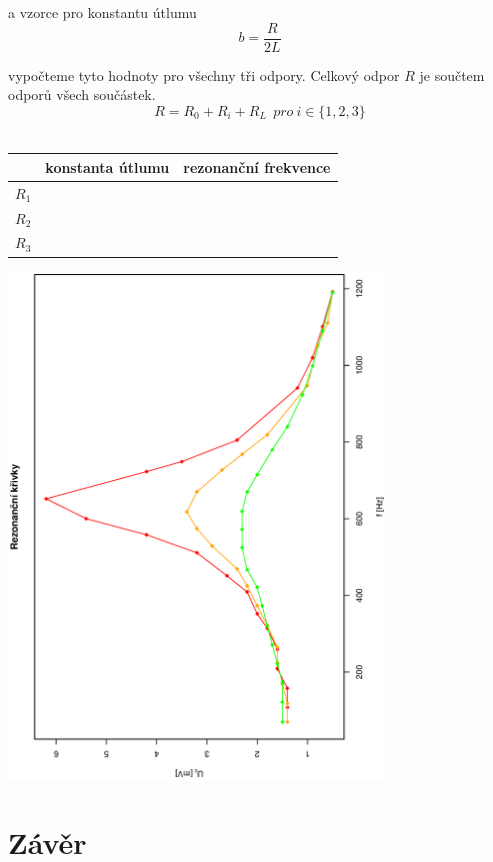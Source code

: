 \documentclass[10pt]{article}
\begin{document}
\noindent
a vzorce pro konstantu útlumu
\begin{equation}
b = \frac{R}{2L}
\end{equation}

\noindent
vypočteme tyto hodnoty pro všechny tři odpory. Celkový odpor $R$ je součtem
odporů všech součástek. \\
$$ R = R_0 + R_i + R_L~~ pro~i \in \{1, 2, 3\}$$ \\

\begin{tabular}[b]{|l|c|c|}
\hline
& konstanta útlumu & rezonanční frekvence \\
\hline
$R_1$ & & \\
$R_2$ & & \\
$R_3$ & & \\
\hline
\end{tabular}

\vspace{1cm}

\includegraphics[width=10cm,angle=270]{graf.eps}
\section{Závěr}
\end{document}
